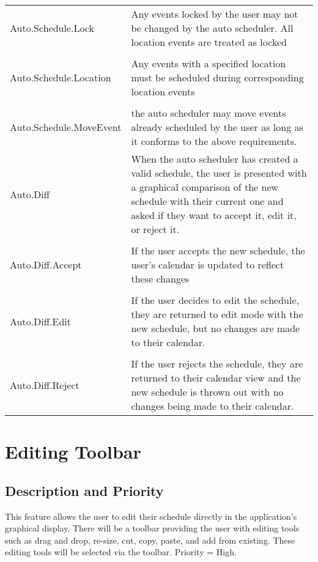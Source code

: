 \documentclass{scrreprt}
\begin{document}
\begin{center}
\begin{longtable}{ | p{6cm} | p{9cm} | }
Auto.Schedule.Lock & Any events locked by the user may not be changed by the
auto scheduler.  All location events are treated as locked\\
& \\
Auto.Schedule.Location & Any events with a specified location must be scheduled
during corresponding location events\\
& \\
Auto.Schedule.MoveEvent & the auto scheduler may move events already scheduled by
the user as long as it conforms to the above requirements.\\
\hline
Auto.Diff & When the auto scheduler has created a valid schedule, the user is
presented with a graphical comparison of the new schedule with their current one
and asked if they want to accept it, edit it, or reject it.\\
& \\
Auto.Diff.Accept & If the user accepts the new schedule, the user's calendar is
updated to reflect these changes\\
& \\
Auto.Diff.Edit & If the user decides to edit the schedule, they are returned to
edit mode with the new schedule, but no changes are made to their calendar.\\
& \\
Auto.Diff.Reject & If the user rejects the schedule, they are returned to their
calendar view and the new schedule is thrown out with no changes being made to
their calendar.\\
\hline
\end{longtable}
\end{center}

\section{Editing Toolbar}

\subsection{Description and Priority}
This feature allows the user to edit their schedule directly in the application's
graphical display. There will be a toolbar providing the user with editing tools
such as drag and drop, re-size, cut, copy, paste, and add from existing. These editing
tools will be selected via the toolbar. Priority = High.
\end{document}
